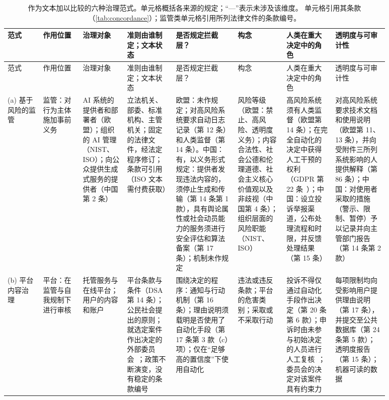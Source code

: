 \begingroup\scriptsize
\setlength{\tabcolsep}{3pt}
\renewcommand{\arraystretch}{1.1}
\begin{longtable}{@{}>{\raggedright\arraybackslash}p{0.08\linewidth}>{\raggedright\arraybackslash}p{0.095\linewidth}>{\raggedright\arraybackslash}p{0.10\linewidth}>{\raggedright\arraybackslash}p{0.115\linewidth}>{\raggedright\arraybackslash}p{0.14\linewidth}>{\raggedright\arraybackslash}p{0.11\linewidth}>{\raggedright\arraybackslash}p{0.115\linewidth}>{\raggedright\arraybackslash}p{0.125\linewidth}@{}}
\caption{作为文本加以比较的六种治理范式。单元格概括各来源的规定；“---”表示未涉及该维度。\pol{} 单元格引用其条款（\cref{tab:concordance}）；监管类单元格引用所列法律文件的条款编号。}\label{tab:paradigms}\\
\toprule
范式 & 作用位置 & 治理对象 & 准则由谁制定；文本状态 & 是否规定拦截层？ & 构念 & 人类在重大决定中的角色 & 透明度与可审计性 \\
\midrule
\endfirsthead
\toprule
范式 & 作用位置 & 治理对象 & 准则由谁制定；文本状态 & 是否规定拦截层？ & 构念 & 人类在重大决定中的角色 & 透明度与可审计性 \\
\midrule
\endhead
\bottomrule
\endfoot
(a) 基于风险的监管~\cite{euaiact2024,nist2023airmf,iso42001,cac2023genai} & 监管：对行为主体施加事前义务 & AI 系统的提供者和部署者（欧盟）；组织的 AI 管理（NIST、ISO）；向公众提供生成式服务的提供者（中国第 2 条） & 立法机关、部委、标准机构、主管机关；固定的法律文件，经法定程序修订；条款可引用（ISO 文本需付费获取） & 欧盟：未作规定；对高风险系统要求自动日志记录（第 12 条）和人类监督（第 14 条）。中国：有，以义务形式规定：提供者发现违法内容的，须停止生成和传输（第 14 条第 1 款），具有舆论属性或社会动员能力的服务须进行安全评估和算法备案（第 17 条）；机制未作规定 & 风险等级（欧盟：禁止、高风险、透明度义务）；内容合法性、社会公德和伦理道德、社会主义核心价值观以及非歧视（中国第 4 条）；组织层面的风险职能（NIST、ISO） & 高风险系统须有人类监督（欧盟第 14 条）；在完全自动化的决定中获得人工干预的权利（GDPR 第 22 条~\cite{gdpr2016}）；中国：设立投诉举报渠道，公布处理流程和时限，并反馈处理结果（第 15 条） & 对高风险系统要求技术文档和使用说明（欧盟第 11、13 条），并向受附件三所列系统影响的人提供解释（第 86 条）；中国：对使用者采取的措施（警示、限制、暂停）予以记录并向主管部门报告（第 14 条第 2 款） \\
\addlinespace
(b) 平台内容治理~\cite{dsa2022,santaclara2021,klonick2020oversight} & 平台：在监管与自我规制下进行审核 & 托管服务与在线平台；用户的内容和账户 & 平台条款与条件（DSA 第 14 条）；公民社会提出的原则；就选定案件作出决定的外部委员会~\cite{klonick2020oversight}；政策不断演变，没有稳定的条款编号 & 围绕决定的程序：通知与行动机制（第 16 条）；理由说明须载明是否使用了自动化手段（第 17 条第 3 款（c）项）；仅在“足够高的置信度”下使用自动化~\cite{santaclara2021} & 违法或违反条款；平台的危害类别；采取或不采取行动 & 投诉不得仅通过自动化手段作出决定（第 20 条第 6 款）；申诉时由未参与初始决定的人员进行人工复核~\cite{santaclara2021}；委员会的决定对该案件具有约束力~\cite{klonick2020oversight} & 每项限制均向受影响用户提供理由说明（第 17 条），并提交至公共数据库（第 24 条第 5 款）；透明度报告（第 15 条）；机器可读的数据~\cite{santaclara2021} \\

\end{longtable}

